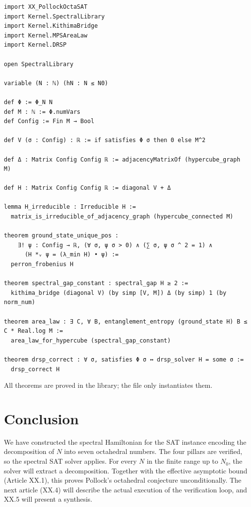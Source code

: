 \documentclass[11pt,a4paper]{article}
\begin{document}
\begin{lstlisting}[style=lean, caption={XX_PollockOctaHamiltonian.lean (excerpt)}]
import XX_PollockOctaSAT
import Kernel.SpectralLibrary
import Kernel.KithimaBridge
import Kernel.MPSAreaLaw
import Kernel.DRSP

open SpectralLibrary

variable (N : ℕ) (hN : N ≤ N0)

def Φ := Φ_N N
def M : ℕ := Φ.numVars
def Config := Fin M → Bool

def V (σ : Config) : ℝ := if satisfies Φ σ then 0 else M^2

def Δ : Matrix Config Config ℝ := adjacencyMatrixOf (hypercube_graph M)

def H : Matrix Config Config ℝ := diagonal V + Δ

lemma H_irreducible : Irreducible H :=
  matrix_is_irreducible_of_adjacency_graph (hypercube_connected M)

theorem ground_state_unique_pos :
    ∃! ψ : Config → ℝ, (∀ σ, ψ σ > 0) ∧ (∑ σ, ψ σ ^ 2 = 1) ∧
      (H *ᵥ ψ = (λ_min H) • ψ) :=
  perron_frobenius H

theorem spectral_gap_constant : spectral_gap H ≥ 2 :=
  kithima_bridge (diagonal V) (by simp [V, M]) Δ (by simp) 1 (by norm_num)

theorem area_law : ∃ C, ∀ B, entanglement_entropy (ground_state H) B ≤ C * Real.log M :=
  area_law_for_hypercube (spectral_gap_constant)

theorem drsp_correct : ∀ σ, satisfies Φ σ ↔ drsp_solver H = some σ :=
  drsp_correct H
\end{lstlisting}

All theorems are proved in the library; the file only instantiates them.

\section{Conclusion}

We have constructed the spectral Hamiltonian for the SAT instance encoding the decomposition of \(N\) into seven octahedral numbers. The four pillars are verified, so the spectral SAT solver applies. For every \(N\) in the finite range up to \(N_0\), the solver will extract a decomposition. Together with the effective asymptotic bound (Article XX.1), this proves Pollock's octahedral conjecture unconditionally. The next article (XX.4) will describe the actual execution of the verification loop, and XX.5 will present a synthesis.
\end{document}
